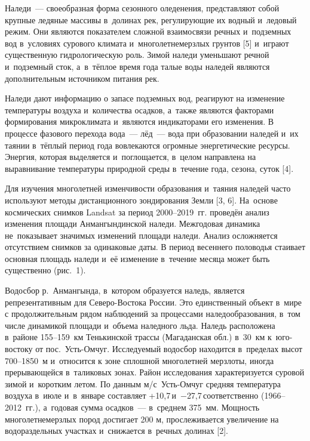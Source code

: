  

\makeProcTitle
{}

Наледи~--- своеобразная форма сезонного оледенения, представляют собой крупные ледяные массивы в~долинах рек, регулирующие их водный и~ледовый режим.  Они являются показателем сложной взаимосвязи речных и~подземных вод в~условиях сурового климата и~многолетнемерзлых грунтов [5] и~играют существенную гидрологическую роль. Зимой наледи уменьшают речной и~подземный сток, а~в~тёплое время года талые воды наледей являются дополнительным источником питания рек.

Наледи дают информацию о запасе подземных вод, реагируют на изменение температуры воздуха и~количества осадков, а~также являются факторами формирования микроклимата и~являются индикаторами его изменения. В процессе фазового перехода вода~--- лёд~--- вода при образовании наледей и~их таянии в~тёплый период года вовлекаются огромные энергетические ресурсы. Энергия, которая выделяется и~поглощается, в~целом направлена на выравнивание температуры природной среды в~течение года, сезона, суток [4].

Для изучения многолетней изменчивости образования и~таяния наледей часто используют методы дистанционного зондирования Земли [3, 6]. На~основе космических снимков Landsat за период 2000--2019~гг. проведён анализ изменения площади Анмангындинской наледи. Межгодовая динамика не~показывает значимых изменений площади наледи. Анализ осложняется отсутствием снимков за одинаковые даты. В период весеннего половодья стаивает основная площадь наледи и~её изменение в~течение месяца может быть существенно (рис.~1).



Водосбор р.~Анмангында, в~котором образуется наледь, является репрезентативным для Северо-Востока России. Это единственный объект в~мире с продолжительным рядом наблюдений за процессами наледообразования, в~том числе динамикой площади и~объема наледного льда. Наледь расположена в~районе 155--159~км Тенькинской трассы (Магаданская обл.) в~30~км к~юго-востоку от пос.~Усть-Омчуг. Исследуемый водосбор находится в~пределах высот 700--1850~м и~относится к зоне сплошной многолетней мерзлоты, иногда прерывающейся в~таликовых зонах. Район исследования характеризуется суровой зимой и~коротким летом. По данным м/с~Усть-Омчуг средняя температура воздуха в~июле и~в~январе составляет +10,7\,\dgc и~$-$27,7\,\dgc соответственно (1966--2012~гг.), а~годовая сумма осадков~--- в~среднем 375~мм. Мощность многолетнемерзлых пород достигает 200 м, прослеживается увеличение на водораздельных участках и~снижается в~речных долинах [2].

